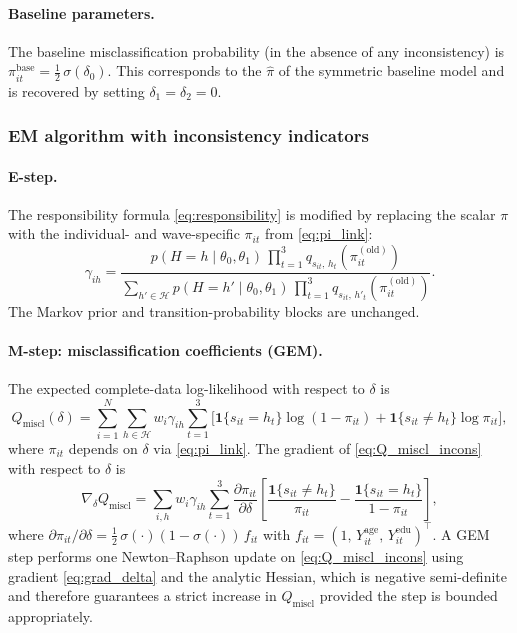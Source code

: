 \paragraph{Baseline parameters.}
The baseline misclassification probability (in the absence of any
inconsistency) is \(\pi_{it}^{\text{base}} = \frac{1}{2}\,\sigma(\delta_0)\).
This corresponds to the \(\hat\pi\) of the symmetric baseline model and
is recovered by setting \(\delta_1 = \delta_2 = 0\).

\subsubsection{EM algorithm with inconsistency indicators}

\paragraph{E-step.}
The responsibility formula \eqref{eq:responsibility} is modified by
replacing the scalar \(\pi\) with the individual- and wave-specific
\(\pi_{it}\) from \eqref{eq:pi_link}:
\begin{equation}
\gamma_{ih} =
\frac{
  p(H = h \mid \theta_0, \theta_1)\,
  \prod_{t=1}^{3} q_{s_{it},\, h_t}(\pi_{it}^{(\text{old})})
}{
  \sum_{h' \in \mathcal{H}}
  p(H = h' \mid \theta_0, \theta_1)\,
  \prod_{t=1}^{3} q_{s_{it},\, h'_t}(\pi_{it}^{(\text{old})})
}.
\label{eq:responsibility_incons}
\end{equation}
The Markov prior and transition-probability blocks are unchanged.

\paragraph{M-step: misclassification coefficients (GEM).}
The expected complete-data log-likelihood with respect to \(\delta\) is
\begin{equation}
Q_{\text{miscl}}(\delta) = \sum_{i=1}^{N} \sum_{h \in \mathcal{H}}
  w_i \gamma_{ih}
  \sum_{t=1}^{3} \Big[
    \mathbf{1}\{s_{it} = h_t\}\log(1 - \pi_{it})
    + \mathbf{1}\{s_{it} \neq h_t\}\log\pi_{it}
  \Big],
\label{eq:Q_miscl_incons}
\end{equation}
where \(\pi_{it}\) depends on \(\delta\) via \eqref{eq:pi_link}. The
gradient of \eqref{eq:Q_miscl_incons} with respect to \(\delta\) is
\begin{equation}
\nabla_\delta Q_{\text{miscl}} = \sum_{i,h} w_i \gamma_{ih}
  \sum_{t=1}^{3}
  \frac{\partial \pi_{it}}{\partial \delta}
  \left[
    \frac{\mathbf{1}\{s_{it} \neq h_t\}}{\pi_{it}}
    - \frac{\mathbf{1}\{s_{it} = h_t\}}{1 - \pi_{it}}
  \right],
\label{eq:grad_delta}
\end{equation}
where \(\partial \pi_{it}/\partial \delta =
\tfrac{1}{2}\,\sigma(\cdot)(1 - \sigma(\cdot))\, f_{it}\)
with \(f_{it} = (1,\, Y_{it}^{\text{age}},\, Y_{it}^{\text{edu}})^\top\).
A GEM step performs one Newton--Raphson update on
\eqref{eq:Q_miscl_incons} using gradient \eqref{eq:grad_delta} and the
analytic Hessian, which is negative semi-definite and therefore
guarantees a strict increase in \(Q_{\text{miscl}}\) provided the step
is bounded appropriately.

